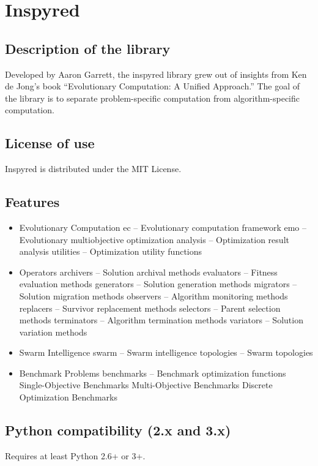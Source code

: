 \documentclass{article}
\begin{document}
	\section{Inspyred}
	\subsection{Description of the library}
	Developed by Aaron Garrett, the inspyred library grew out of insights from Ken de Jong’s book “Evolutionary Computation: A Unified Approach.” The goal of the library is to separate problem-specific computation from algorithm-specific computation.
	\subsection{License of use}
	Inspyred is distributed under the MIT License. 
	\subsection{Features}
	\begin{itemize}
		\item Evolutionary Computation
		\subitem ec – Evolutionary computation framework
		\subitem emo – Evolutionary multiobjective optimization
		\subitem analysis – Optimization result analysis
		\subitem utilities – Optimization utility functions
		\item Operators
		\subitem archivers – Solution archival methods
		\subitem  evaluators – Fitness evaluation methods
		\subitem generators – Solution generation methods
		\subitem migrators – Solution migration methods
		\subitem observers – Algorithm monitoring methods
		\subitem replacers – Survivor replacement methods
		\subitem selectors – Parent selection methods
		\subitem terminators – Algorithm termination methods
		\subitem variators – Solution variation methods
		\item Swarm Intelligence
		\subitem swarm – Swarm intelligence
		\subitem topologies – Swarm topologies
		\item Benchmark Problems
		\subitem benchmarks – Benchmark optimization functions
		\subitem Single-Objective Benchmarks
		\subitem Multi-Objective Benchmarks
		\subitem Discrete Optimization Benchmarks
		
	\end{itemize}
	\subsection{Python compatibility (2.x and 3.x)}
	Requires at least Python 2.6+ or 3+.
\end{document}
